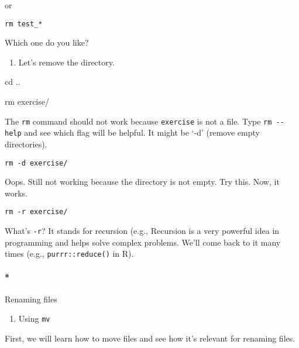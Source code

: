 \documentclass[
  letterpaper,
  DIV=11,
  numbers=noendperiod]{scrreprt}
\let\oldparagraph\paragraph
\renewcommand{\paragraph}[1]{\oldparagraph{#1}\mbox{}}
\newenvironment{Shaded}{\begin{snugshade}}{\end{snugshade}}
\newcommand{\BuiltInTok}[1]{\textcolor[rgb]{0.00,0.23,0.31}{#1}}
\newcommand{\FunctionTok}[1]{\textcolor[rgb]{0.28,0.35,0.67}{#1}}
\newcommand{\NormalTok}[1]{\textcolor[rgb]{0.00,0.23,0.31}{#1}}
\providecommand{\tightlist}{%
  \setlength{\itemsep}{0pt}\setlength{\parskip}{0pt}}\usepackage{longtable,booktabs,array}
\begin{document}
or

\begin{verbatim}
rm test_*
\end{verbatim}

Which one do you like?

\begin{enumerate}
\def\labelenumi{\arabic{enumi}.}
\setcounter{enumi}{3}
\tightlist
\item
  Let's remove the directory.
\end{enumerate}

\begin{Shaded}
\begin{Highlighting}[]

\BuiltInTok{cd}\NormalTok{ .. }

\FunctionTok{rm}\NormalTok{ exercise/}
\end{Highlighting}
\end{Shaded}

The \texttt{rm} command should not work because \texttt{exercise} is not
a file. Type \texttt{rm\ -\/-help} and see which flag will be helpful.
It might be `-d' (remove empty directories).

\begin{verbatim}
rm -d exercise/  
\end{verbatim}

Oops. Still not working because the directory is not empty. Try this.
Now, it works.

\begin{verbatim}
rm -r exercise/ 
\end{verbatim}

What's \texttt{-r}? It stands for recursion (e.g., Recursion is a very
powerful idea in programming and helps solve complex problems. We'll
come back to it many times (e.g., \texttt{purrr::reduce()} in R).

\hypertarget{renaming-files}{%
\paragraph*{Renaming files}\label{renaming-files}}

\begin{enumerate}
\def\labelenumi{\arabic{enumi}.}
\tightlist
\item
  Using \texttt{mv}
\end{enumerate}

First, we will learn how to move files and see how it's relevant for
renaming files.
\end{document}
